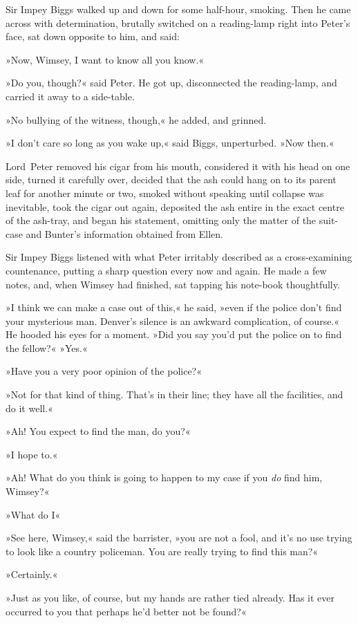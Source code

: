 Sir Impey Biggs walked up and down for some half-hour, smoking. Then he came across with determination, brutally switched on a reading-lamp right into Peter's face, sat down opposite to him, and said:

»Now, Wimsey, I want to know all you know.«

»Do you, though?« said Peter. He got up, disconnected the reading-lamp, and carried it away to a side-table.

»No bullying of the witness, though,« he added, and grinned.

»I don't care so long as you wake up,« said Biggs, unperturbed. »Now then.«

Lord~Peter removed his cigar from his mouth, considered it with his head on one side, turned it carefully over, decided that the ash could hang on to its parent leaf for another minute or two, smoked without speaking until collapse was inevitable, took the cigar out again, deposited the ash entire in the exact centre of the ash-tray, and began his statement, omitting only the matter of the suit-case and Bunter's information obtained from Ellen.

Sir Impey Biggs listened with what Peter irritably described as a cross-examining countenance, putting a sharp question every now and again. He made a few notes, and, when Wimsey had finished, sat tapping his note-book thoughtfully.

»I think we can make a case out of this,« he said, »even if the police don't find your mysterious man. Denver's silence is an awkward complication, of course.« He hooded his eyes for a moment. »Did you say you'd put the police on to find the fellow?«
»Yes.«

»Have you a very poor opinion of the police?«

»Not for that kind of thing. That's in their line; they have all the facilities, and do it well.«

»Ah! You expect to find the man, do you?«

»I hope to.«

»Ah! What do you think is going to happen to my case if you \textit{do} find him, Wimsey?«

»What do I\longdash«

»See here, Wimsey,« said the barrister, »you are not a fool, and it's no use trying to look like a country policeman. You are really trying to find this man?«

»Certainly.«

»Just as you like, of course, but my hands are rather tied already. Has it ever occurred to you that perhaps he'd better not be found?«

